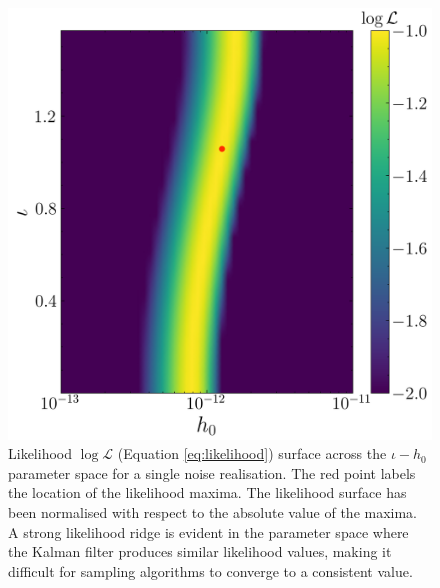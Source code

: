 \documentclass[fleqn,usenatbib,useAMS]{mnras}
\begin{document}
\begin{figure}
	\centering
	\includegraphics[width=\columnwidth]{images/likelihood_surface}
	\caption{Likelihood $\log \mathcal{L}$ (Equation \ref{eq:likelihood}) surface across the $\iota - h_0$ parameter space for a single noise realisation. The red point labels the location of the likelihood maxima. The likelihood surface has been normalised with respect to the absolute value of the maxima. A strong likelihood ridge is evident in the parameter space where the Kalman filter produces similar likelihood values, making it difficult for sampling algorithms to converge to a consistent value.}
	\label{fig:likelihood_surface}
\end{figure}
\end{document}
